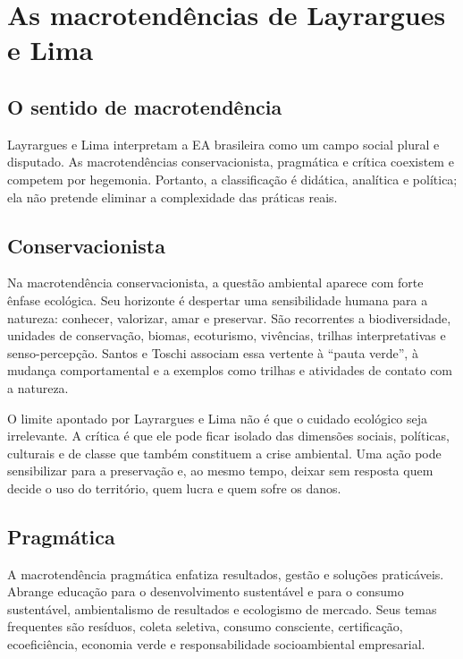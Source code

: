 \documentclass[12pt,a4paper]{article}
\begin{document}
\section{As macrotendências de Layrargues e Lima}

\subsection{O sentido de macrotendência}

Layrargues e Lima interpretam a EA brasileira como um campo social plural e disputado. As macrotendências conservacionista, pragmática e crítica coexistem e competem por hegemonia. Portanto, a classificação é didática, analítica e política; ela não pretende eliminar a complexidade das práticas reais.

\subsection{Conservacionista}

Na macrotendência conservacionista, a questão ambiental aparece com forte ênfase ecológica. Seu horizonte é despertar uma sensibilidade humana para a natureza: conhecer, valorizar, amar e preservar. São recorrentes a biodiversidade, unidades de conservação, biomas, ecoturismo, vivências, trilhas interpretativas e senso-percepção. Santos e Toschi associam essa vertente à ``pauta verde'', à mudança comportamental e a exemplos como trilhas e atividades de contato com a natureza.

O limite apontado por Layrargues e Lima não é que o cuidado ecológico seja irrelevante. A crítica é que ele pode ficar isolado das dimensões sociais, políticas, culturais e de classe que também constituem a crise ambiental. Uma ação pode sensibilizar para a preservação e, ao mesmo tempo, deixar sem resposta quem decide o uso do território, quem lucra e quem sofre os danos.

\subsection{Pragmática}

A macrotendência pragmática enfatiza resultados, gestão e soluções praticáveis. Abrange educação para o desenvolvimento sustentável e para o consumo sustentável, ambientalismo de resultados e ecologismo de mercado. Seus temas frequentes são resíduos, coleta seletiva, consumo consciente, certificação, ecoeficiência, economia verde e responsabilidade socioambiental empresarial.
\end{document}
